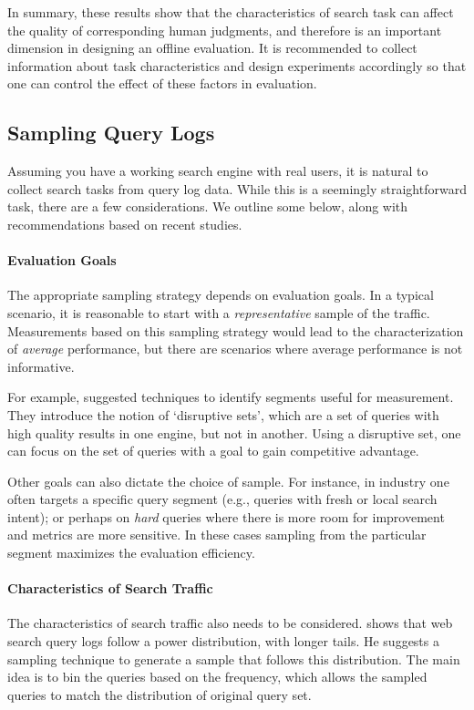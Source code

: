 In summary, these results show that the characteristics of search task can affect the quality of corresponding human judgments, and therefore is an important dimension in designing an offline evaluation. It is recommended to collect information about task characteristics and design experiments accordingly so that one can control the effect of these factors in evaluation.

\subsection{Sampling Query Logs}
Assuming you have a working search engine with real users, it is natural to collect search tasks from query log data. While this is a seemingly straightforward task, there are a few considerations. We outline some below, along with recommendations based on recent studies.

\paragraph{Evaluation Goals} The appropriate sampling strategy depends on evaluation goals. In a typical scenario, it is reasonable to start with a \textit{representative} sample of the traffic. Measurements based on this sampling strategy would lead to the characterization of \textit{average} performance, but there are scenarios where average performance is not informative. 

For example, \cite{Zaragoza:2010} suggested techniques to identify segments useful for measurement. They introduce the notion of `disruptive sets', which are a set of queries with high quality results in one engine, but not in another. Using a disruptive set, one can focus on the set of queries with a goal to gain competitive advantage.

Other goals can also dictate the choice of sample. For instance, in industry one often targets a specific query segment (e.g., queries with fresh or local search intent); or perhaps on \textit{hard} queries where there is more room for improvement and metrics are more sensitive. In these cases sampling from the particular segment maximizes the evaluation efficiency.

\paragraph{Characteristics of Search Traffic} The characteristics of search traffic also needs to be considered. \cite{Baeza-Yates:2015} shows that web search query logs follow a power distribution, with longer tails. He suggests a sampling technique to generate a sample that follows this distribution. The main idea is to bin the queries based on the frequency, which allows the sampled queries to match the distribution of original query set. 

